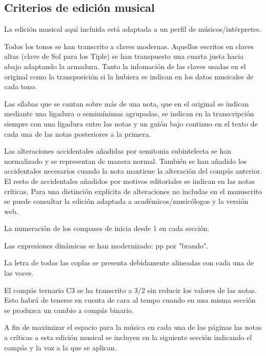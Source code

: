 \subsection*{Criterios de edición musical}
\noindent La edición musical aquí incluida está adaptada a un perfil de músicos/intérpretes.

\noindent Todos los tonos se han transcrito a claves modernas. Aquellos escritos en claves altas (clave de Sol para los Tiple) se han transpuesto una cuarta justa hacia abajo adaptando la armadura. Tanto la infomación de las claves usadas en el original como la transposición si la hubiera se indican en los datos musicales de cada tono.

\noindent Las sílabas que se cantan sobre más de una nota, que en el original se indican mediante una ligadura o semimínimas agrupadas, se indican en la transcripción siempre con una ligadura entre las notas y un guión bajo continuo en el texto de cada una de las notas posteriores a la primera. 

\noindent Las alteraciones accidentales añadidas por semitonia subintelecta se han normalizado y se representan de manera normal. También se han añadido los accidentales necesarios cuando la nota mantiene la alteración del compás anterior. El resto de accidentales añadidos por motivos editoriales se indican en las notas críticas. Para una distinción explícita de alteraciones no includas en el manuscrito se puede consultar la edición adaptada a académicos/musicólogos y la versión web. 

\noindent La numeración de los compases de inicia desde 1 en cada sección.

\noindent Las expresiones dinámicas se han modernizado: pp por "brando".

\noindent La letra de todas las coplas se presenta debidamente alineadas con cada una de las voces. 

\noindent El compás ternario C3 se ha transcrito a 3/2 sin reducir los valores de las notas. Esto habrá de tenerse en cuenta de cara al tempo cuando en una misma sección se produzca un cambio a compás binario.

\noindent A fin de maximizar el espacio para la música en cada una de las páginas las notas a críticas a esta edición musical se incluyen en la siguiente sección indicando el compás y la voz a la que se aplican. 

